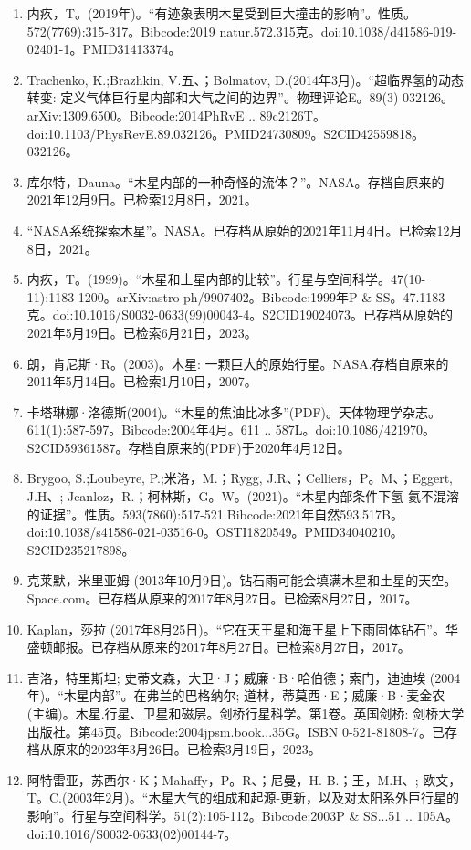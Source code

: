 \begin{enumerate}
\item 内疚，T。(2019年)。“有迹象表明木星受到巨大撞击的影响”。性质。572(7769):315-317。Bibcode:2019 natur.572.315克。doi:10.1038/d41586-019-02401-1。PMID31413374。 
\item Trachenko, K.;Brazhkin, V.五、；Bolmatov, D.(2014年3月)。“超临界氢的动态转变: 定义气体巨行星内部和大气之间的边界”。物理评论E。89(3) 032126。arXiv:1309.6500。Bibcode:2014PhRvE .. 89c2126T。doi:10.1103/PhysRevE.89.032126。PMID24730809。S2CID42559818。032126。  
\item 库尔特，Dauna。“木星内部的一种奇怪的流体？”。NASA。存档自原来的2021年12月9日。已检索12月8日，2021。
\item “NASA系统探索木星”。NASA。已存档从原始的2021年11月4日。已检索12月8日，2021。
\item 内疚，T。(1999)。“木星和土星内部的比较”。行星与空间科学。47(10-11):1183-1200。arXiv:astro-ph/9907402。Bibcode:1999年P & SS。47.1183克。doi:10.1016/S0032-0633(99)00043-4。S2CID19024073。已存档从原始的2021年5月19日。已检索6月21日，2023。 
\item 朗，肯尼斯·R。(2003)。木星: 一颗巨大的原始行星。NASA.存档自原来的2011年5月14日。已检索1月10日，2007。
\item 卡塔琳娜·洛德斯(2004)。“木星的焦油比冰多”(PDF)。天体物理学杂志。611(1):587-597。Bibcode:2004年4月。611 .. 587L。doi:10.1086/421970。S2CID59361587。存档自原来的(PDF)于2020年4月12日。  
\item Brygoo, S.;Loubeyre, P.;米洛，M.；Rygg, J.R、；Celliers，P。M、；Eggert, J.H、; Jeanloz，R.；柯林斯，G。W。(2021)。“木星内部条件下氢-氦不混溶的证据”。性质。593(7860):517-521.Bibcode:2021年自然593.517B。doi:10.1038/s41586-021-03516-0。OSTI1820549。PMID34040210。S2CID235217898。   
\item 克莱默，米里亚姆 (2013年10月9日)。钻石雨可能会填满木星和土星的天空。Space.com。已存档从原来的2017年8月27日。已检索8月27日，2017。
\item Kaplan，莎拉 (2017年8月25日)。“它在天王星和海王星上下雨固体钻石”。华盛顿邮报。已存档从原来的2017年8月27日。已检索8月27日，2017。
\item 吉洛，特里斯坦; 史蒂文森，大卫·J；威廉·B·哈伯德；索门，迪迪埃 (2004年)。“木星内部”。在弗兰的巴格纳尔; 道林，蒂莫西·E；威廉·B·麦金农 (主编)。木星.行星、卫星和磁层。剑桥行星科学。第1卷。英国剑桥: 剑桥大学出版社。第45页。Bibcode:2004jpsm.book...35G。ISBN 0-521-81808-7。已存档从原来的2023年3月26日。已检索3月19日，2023。
\item 阿特雷亚，苏西尔·K；Mahaffy，P。R、；尼曼，H. B.；王，M.H、; 欧文，T。C.(2003年2月)。“木星大气的组成和起源-更新，以及对太阳系外巨行星的影响”。行星与空间科学。51(2):105-112。Bibcode:2003P & SS...51 .. 105A。doi:10.1016/S0032-0633(02)00144-7。

\end{enumerate}
